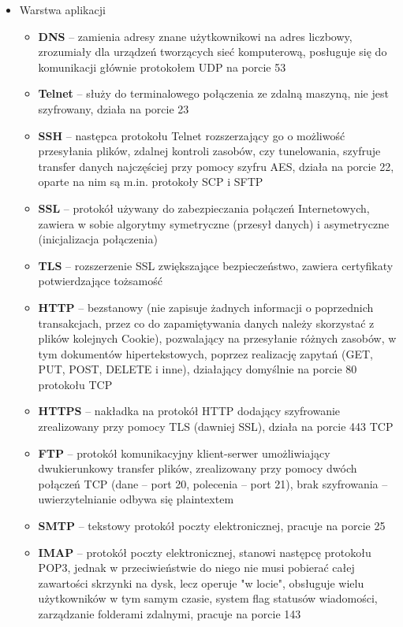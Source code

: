 \begin{itemize}
    \item Warstwa aplikacji
	\begin{itemize}
    	\item \textbf{DNS} -- zamienia adresy znane użytkownikowi na adres liczbowy, zrozumiały dla urządzeń tworzących sieć komputerową, posługuje się do komunikacji głównie protokołem UDP na porcie 53
    	\item \textbf{Telnet} -- służy do terminalowego połączenia ze zdalną maszyną, nie jest szyfrowany, działa na porcie 23
    	\item \textbf{SSH} -- następca protokołu Telnet rozszerzający go o możliwość przesyłania plików, zdalnej kontroli zasobów, czy tunelowania, szyfruje transfer danych najczęściej przy pomocy szyfru AES, działa na porcie 22, oparte na nim są m.in. protokoły SCP i SFTP
    	\item \textbf{SSL} -- protokół używany do zabezpieczania połączeń Internetowych, zawiera w sobie algorytmy symetryczne (przesył danych) i asymetryczne (inicjalizacja połączenia)
		\item \textbf{TLS} -- rozszerzenie SSL zwiększające bezpieczeństwo, zawiera certyfikaty potwierdzające tożsamość
		\item \textbf{HTTP} -- bezstanowy (nie zapisuje żadnych informacji o poprzednich transakcjach, przez co do zapamiętywania danych należy skorzystać z plików kolejnych Cookie), pozwalający na przesyłanie różnych zasobów, w tym dokumentów hipertekstowych, poprzez realizację zapytań (GET, PUT, POST, DELETE i inne), działający domyślnie na porcie 80 protokołu TCP
		\item \textbf{HTTPS} -- nakładka na protokół HTTP dodający szyfrowanie zrealizowany przy pomocy TLS (dawniej SSL), działa na porcie 443 TCP
		\item \textbf{FTP} -- protokół komunikacyjny klient-serwer umożliwiający dwukierunkowy transfer plików, zrealizowany przy pomocy dwóch połączeń TCP (dane -- port 20, polecenia -- port 21), brak szyfrowania -- uwierzytelnianie odbywa się plaintextem 
    	\item \textbf{SMTP} -- tekstowy protokół poczty elektronicznej, pracuje na porcie 25
		\item \textbf{IMAP} -- protokół poczty elektronicznej, stanowi następcę protokołu POP3, jednak w przeciwieństwie do niego nie musi pobierać całej zawartości skrzynki na dysk, lecz operuje "w locie", obsługuje wielu użytkowników w tym samym czasie, system flag statusów wiadomości, zarządzanie folderami zdalnymi, pracuje na porcie 143
	\end{itemize}
\end{itemize}

